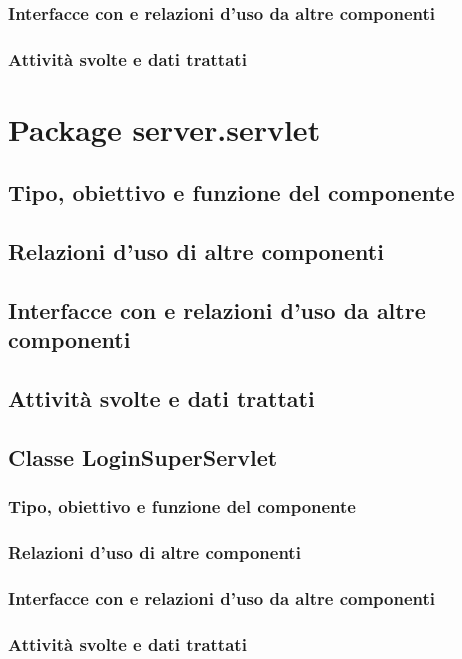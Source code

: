 \subsubsection*{Interfacce con e relazioni d'uso da altre componenti}
\subsubsection*{Attivit\`a svolte e dati trattati}

\newpage
\section{Package server.servlet} %
\subsection*{Tipo, obiettivo e funzione del componente}
\subsection*{Relazioni d'uso di altre componenti}
\subsection*{Interfacce con e relazioni d'uso da altre componenti}
\subsection*{Attivit\`a svolte e dati trattati}

\subsection{Classe LoginSuperServlet}
\subsubsection*{Tipo, obiettivo e funzione del componente}
\subsubsection*{Relazioni d'uso di altre componenti}
\subsubsection*{Interfacce con e relazioni d'uso da altre componenti}
\subsubsection*{Attivit\`a svolte e dati trattati}

